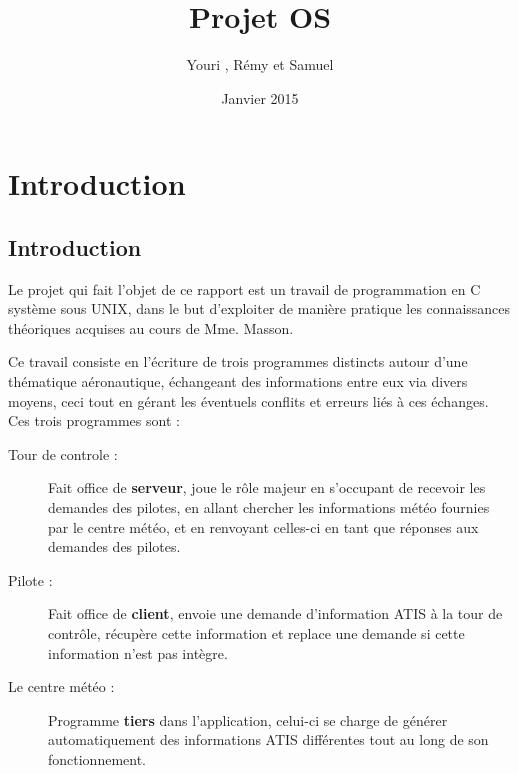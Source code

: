 \documentclass{report}
\title{Projet OS}
\author{Youri \bsc{Mouton}, Rémy \bsc{Voet} et Samuel \bsc{Monroe}}
\date{Janvier 2015}
\begin{document}
\maketitle

\newpage
\thispagestyle{empty}
\mbox{}

\tableofcontents

\chapter{Introduction}

	\section{Introduction}
		Le projet qui fait l'objet de ce rapport est un travail de programmation
		en C système sous UNIX, dans le but d'exploiter de manière pratique les connaissances théoriques acquises au cours de Mme. Masson.
		\newline

		Ce travail consiste en l'écriture de trois programmes distincts autour d'une thématique aéronautique, échangeant des informations entre eux via divers moyens, ceci tout en gérant les éventuels conflits et erreurs liés à ces échanges.\newline
		Ces trois programmes sont :\newline
		\begin{description}
			\item[Tour de controle : ]
			Fait office de \textbf{serveur}, joue le rôle majeur en s'occupant de recevoir les demandes des pilotes, en allant chercher les informations météo fournies par le centre météo, et en renvoyant celles-ci en tant que réponses aux demandes des pilotes.\newline

			\item[Pilote : ]
			Fait office de \textbf{client}, envoie une demande d'information ATIS à la tour de contrôle, récupère cette information et replace une demande si cette information n'est pas intègre.\newline

			\item[Le centre météo : ]
			Programme \textbf{tiers} dans l'application, celui-ci se charge de générer automatiquement des informations ATIS différentes tout au long de son fonctionnement.\newline
		\end{description}
\end{document}
